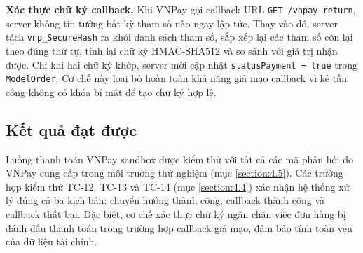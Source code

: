\documentclass[../DoAn.tex]{subfiles}
\begin{document}
\textbf{Xác thực chữ ký callback.} Khi VNPay gọi callback URL \break \texttt{GET
/vnpay-return}, server không tin tưởng bất kỳ tham số nào ngay lập tức. Thay
vào đó, server tách \texttt{vnp\_SecureHash} ra khỏi danh sách tham số, sắp
xếp lại các tham số còn lại theo đúng thứ tự, tính lại chữ ký HMAC-SHA512 và
so sánh với giá trị nhận được. Chỉ khi hai chữ ký khớp, server mới cập nhật \break
\texttt{statusPayment = true} trong \texttt{ModelOrder}. Cơ chế này loại bỏ
hoàn toàn khả năng giả mạo callback vì kẻ tấn công không có khóa bí mật để
tạo chữ ký hợp lệ.

\subsection{Kết quả đạt được}
\label{subsection:5.4.3}

Luồng thanh toán VNPay sandbox được kiểm thử với tất cả các mã phản hồi do
VNPay cung cấp trong môi trường thử nghiệm (mục \ref{section:4.5}). Các
trường hợp kiểm thử TC-12, TC-13 và TC-14 (mục \ref{section:4.4}) xác nhận
hệ thống xử lý đúng cả ba kịch bản: chuyển hướng thành công, callback thành
công và callback thất bại. Đặc biệt, cơ chế xác thực chữ ký ngăn chặn việc
đơn hàng bị đánh dấu thanh toán trong trường hợp callback giả mạo, đảm bảo
tính toàn vẹn của dữ liệu tài chính.
\end{document}
